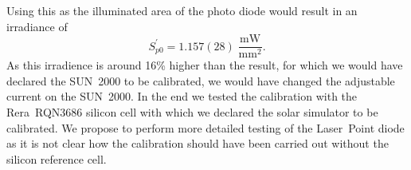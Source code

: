 Using this as the illuminated area of the photo diode would result in an irradiance of
\begin{equation*}
S^\prime_{p0} = 1.157(28)\;\frac{\text{mW}}{\text{mm}^2}.
\end{equation*}
As this irradience is around 16\% higher than the result, for which we would have declared the SUN~2000 to be calibrated, we would have changed the adjustable current on the SUN~2000. In the end we tested the calibration with the Rera~RQN3686 silicon cell with which we declared the solar simulator to be calibrated. We propose to perform more detailed testing of the Laser~Point diode as it is not clear how the calibration should have been carried out without the silicon reference cell.


